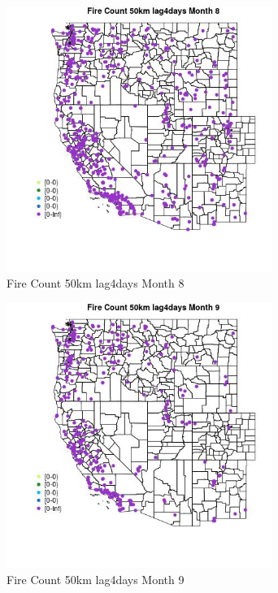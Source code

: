 \begin{figure} 
\centering  
\includegraphics[width=0.77\textwidth]{Code_Outputs/Report_ML_input_PM25_Step4_part_e_de_duplicated_aves_compiled_2019-05-18wNAs_MapObsMo8Fire_Count_50km_lag4days.jpg} 
\caption{\label{fig:Report_ML_input_PM25_Step4_part_e_de_duplicated_aves_compiled_2019-05-18wNAsMapObsMo8Fire_Count_50km_lag4days}Fire Count 50km lag4days Month 8} 
\end{figure} 
 

\begin{figure} 
\centering  
\includegraphics[width=0.77\textwidth]{Code_Outputs/Report_ML_input_PM25_Step4_part_e_de_duplicated_aves_compiled_2019-05-18wNAs_MapObsMo9Fire_Count_50km_lag4days.jpg} 
\caption{\label{fig:Report_ML_input_PM25_Step4_part_e_de_duplicated_aves_compiled_2019-05-18wNAsMapObsMo9Fire_Count_50km_lag4days}Fire Count 50km lag4days Month 9} 
\end{figure} 
 

